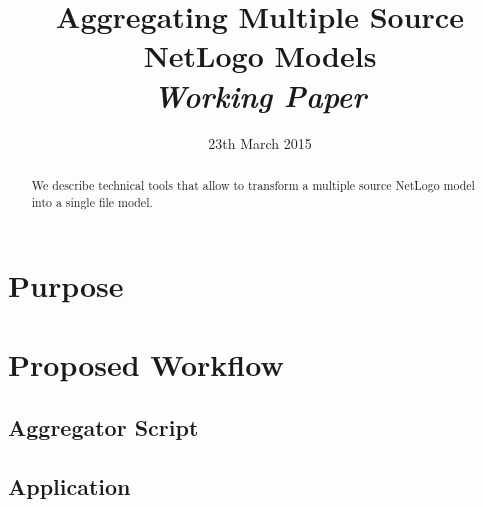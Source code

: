


\title{Aggregating Multiple Source NetLogo Models\bigskip\\
\textit{Working Paper}
}
\author{}
\date{23th March 2015}


\maketitle

\begin{abstract}
We describe technical tools that allow to transform a multiple source NetLogo model into a single file model.
\end{abstract}


\section{Purpose}


\section{Proposed Workflow}

\subsection{Aggregator Script}



\subsection{Application}

















